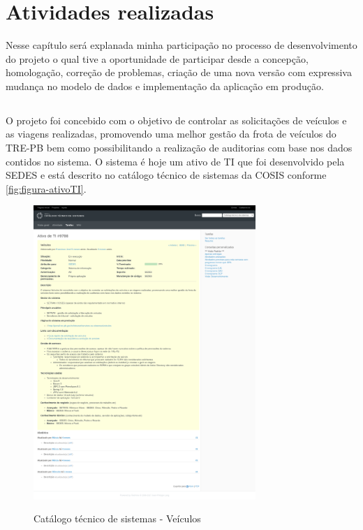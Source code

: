 
\chapter{Atividades realizadas}
\label{chap:atividadesRealizadas}

Nesse capítulo será explanada minha participação no processo de desenvolvimento do projeto o qual tive a oportunidade de participar desde a concepção, homologação, correção de problemas, criação de uma nova versão com expressiva mudança no modelo de dados e implementação da aplicação em produção.

\section{\imprimirtitulo}
\label{sec:atividadesRealizadasVeiculos}

O projeto \imprimirtitulo \space foi concebido com o objetivo de controlar as solicitações de veículos e as viagens realizadas, promovendo uma melhor gestão da frota de veículos do TRE-PB bem como possibilitando a realização de auditorias com base nos dados contidos no sistema.
O sistema é hoje um ativo de TI que foi desenvolvido pela SEDES e está descrito no catálogo técnico de sistemas da COSIS conforme \autoref{fig:figura-ativoTI}. 

\begin{figure}[!htb]
    \centering
    \caption{Catálogo técnico de sistemas - Veículos}
    \includegraphics[width=0.75\textwidth]{./dados/figuras/veiculos-ativoTI}
    \label{fig:figura-ativoTI}
\end{figure}

